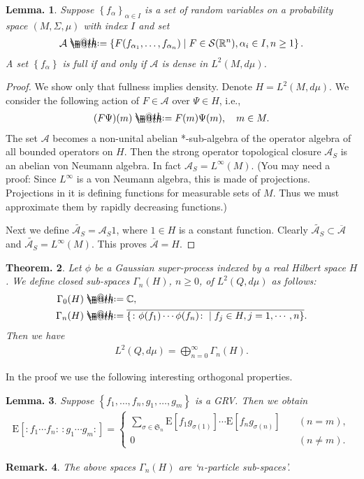 \documentclass[openany, a4paper, oneside]{jsbook}
\makeatletter
\newcommand*{\defeq}{\mathrel{\rlap{%
\raisebox{0.3ex}{$\m@th\cdot$}}%
\raisebox{-0.3ex}{$\m@th\cdot$}}%
=}
\theoremstyle{break}
\newtheorem{thm}{Theorem.}[section]
\newtheorem{lem}[thm]{Lemma.}
\theoremstyle{breakdefn}
\newtheorem{rem}[thm]{Remark.}
\newcommand{\rbk}[1]{\left (#1\right)}
\newcommand{\sqbk}[1]{\left[#1\right]}
\newcommand{\cbk}[1]{\left\{#1\right\}}
\newcommand{\relmiddle}[1]{\mathrel{}\middle#1\mathrel{}}
\newcommand{\set}[2]{\left\{#1 \relmiddle| #2\right\}}
\newcommand{\bbC}{\mathbb{C}}
\newcommand{\bbR}{\mathbb{R}}
\newcommand{\calA}{\mathcal{A}}
\newcommand{\calS}{\mathcal{S}}
\newcommand{\E}[1]{\rmE\sqbk{#1}}
\newcommand{\rmE}{\mathrm{E}}
\makeatother
\begin{document}
\begin{lem}
 Suppose $\cbk{f_{\alpha}}_{\alpha \in I}$ is a set of random variables on a probability space $(M, \Sigma, \mu)$ with index $I$ and set
 \begin{align}
  \calA
  \defeq
  \set{F (f_{\alpha_1}, \dots, f_{\alpha_n})}{F \in \calS (\bbR^n), \alpha_i \in I, n \geq 1}.
 \end{align}
 A set $\cbk{f_{\alpha}}$ is full if and only if $\calA$ is dense in $L^2 (M, d \mu)$.
\end{lem}
\begin{proof}
 We show only that fullness implies density.
 Denote $H = L^2 (M, d \mu)$.
 We consider the following action of $F \in \calA$ over $\Psi \in H$, i.e.,
 \begin{align}
  (F \Psi) (m) \defeq F (m) \Psi (m), \quad m \in M.
 \end{align}
 The set $\calA$ becomes a non-unital abelian *-sub-algebra of the operator algebra of all bounded operators on $H$.
 Then the strong operator topological closure $\calA_S$ is an abelian von Neumann algebra.
 In fact $\calA_S = L^{\infty} (M)$.
 (You may need a proof:
 Since $L^{\infty}$ is a von Neumann algebra, this is made of projections.
 Projections in it is defining functions for measurable sets of $M$.
 Thus we must approximate them by rapidly decreasing functions.)

 Next we define $\tilde{\calA_S} = \calA_S 1$, where $1 \in H$ is a constant function.
 Clearly $\tilde{\calA_S} \subset \overline{\calA}$ and $\tilde{\calA_S} = L^{\infty}(M)$.
 This proves $\overline{\calA} = H$.
\end{proof}

\begin{thm}
 Let $\phi$ be a Gaussian super-process indexed by a real Hilbert space $H$.
 We define closed sub-spaces $\Gamma_n (H)$, $n \geq 0$, of $L^2 (Q, d \mu)$ as follows:
 \begin{align}
  \Gamma_0 (H)
  &\defeq \bbC, \\
  \Gamma_n (H)
  &\defeq
  \overline{\set{\colon \phi (f_1) \cdots \phi (f_n) \colon}{f_j \in H, j = 1, \cdots, n}}.
 \end{align}
 Then we have
 \begin{align}
  L^2 (Q, d \mu)
  =
  \bigoplus_{n=0}^{\infty} \Gamma_n (H).
 \end{align}
\end{thm}
In the proof we use the following interesting orthogonal properties.
\begin{lem}
 Suppose $\cbk{f_1, \dots, f_n, g_1, \dots, g_m}$ is a GRV.
 Then we obtain
 \begin{align}
  \E{\colon f_1 \cdots f_n \colon \, \colon g_1 \cdots g_m \colon}
  =
  \begin{cases}
   \sum_{\sigma \in \mathfrak{S}_n} \E{f_1 g_{\sigma \rbk{1}}} \cdots \E{f_n g_{\sigma \rbk{n}}} &\quad (n=m), \\
   0 &\quad (n \neq m).
  \end{cases}
 \end{align}
\end{lem}
\begin{rem}
 The above spaces $\Gamma_n (H)$ are `$n$-particle sub-spaces'.
\end{rem}
\end{document}
